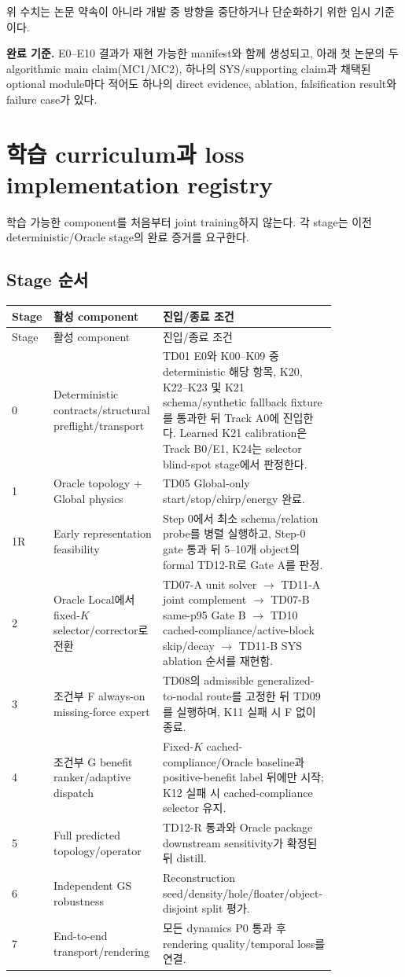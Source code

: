 \documentclass[10pt,a4paper]{article}
\begin{document}
위 수치는 논문 약속이 아니라 개발 중 방향을 중단하거나 단순화하기 위한 임시 기준이다.

\textbf{완료 기준.}
E0--E10 결과가 재현 가능한 manifest와 함께 생성되고,
아래 첫 논문의 두 algorithmic main claim(MC1/MC2), 하나의 SYS/supporting claim과
채택된 optional module마다
적어도 하나의 direct evidence, ablation, falsification result와 failure case가 있다.

\section{학습 curriculum과 loss implementation registry}

학습 가능한 component를 처음부터 joint training하지 않는다.
각 stage는 이전 deterministic/Oracle stage의 완료 증거를 요구한다.

\subsection{Stage 순서}

\begin{longtable}{L{0.06\linewidth}L{0.27\linewidth}L{0.49\linewidth}}
\toprule
Stage & 활성 component & 진입/종료 조건 \\
\midrule
\endfirsthead
\toprule
Stage & 활성 component & 진입/종료 조건 \\
\midrule
{} & Deterministic contracts/structural preflight/transport & TD01 E0와 K00--K09 중 deterministic 해당 항목,
K20, K22--K23 및 K21 schema/synthetic fallback fixture를 통과한 뒤 Track A0에 진입한다.
Learned K21 calibration은 Track B0/E1, K24는 selector blind-spot stage에서 판정한다. \\
1 & Oracle topology + Global physics & TD05 Global-only start/stop/chirp/energy 완료. \\
1R & Early representation feasibility & Step 0에서 최소 schema/relation probe를 병렬 실행하고,
Step-0 gate 통과 뒤 5--10개 object의 formal TD12-R로 Gate A를 판정. \\
2 & Oracle Local에서 fixed-\(K\) selector/corrector로 전환 & TD07-A unit solver
\(\rightarrow\) TD11-A joint complement \(\rightarrow\) TD07-B same-p95 Gate B
\(\rightarrow\) TD10 cached-compliance/active-block skip/decay
\(\rightarrow\) TD11-B SYS ablation 순서를 재현함. \\
3 & 조건부 F always-on missing-force expert & TD08의 admissible generalized-to-nodal route를 고정한 뒤 TD09를 실행하며, K11 실패 시 F 없이 종료. \\
4 & 조건부 G benefit ranker/adaptive dispatch & Fixed-\(K\) cached-compliance/Oracle baseline과 positive-benefit label 뒤에만 시작; K12 실패 시 cached-compliance selector 유지. \\
5 & Full predicted topology/operator & TD12-R 통과와 Oracle package downstream sensitivity가 확정된 뒤 distill. \\
6 & Independent GS robustness & Reconstruction seed/density/hole/floater/object-disjoint split 평가. \\
7 & End-to-end transport/rendering & 모든 dynamics P0 통과 후 rendering quality/temporal loss를 연결. \\
\bottomrule
\end{longtable}
\end{document}
